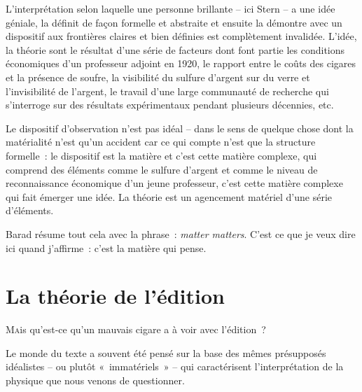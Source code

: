 L'interprétation selon laquelle une personne brillante -- ici Stern -- a
une idée géniale, la définit de façon formelle et abstraite et ensuite
la démontre avec un dispositif aux frontières claires et bien définies
est complètement invalidée. L'idée, la théorie sont le résultat d'une
série de facteurs dont font partie les conditions économiques d'un
professeur adjoint en 1920, le rapport entre le coûts des cigares et la
présence de soufre, la visibilité du sulfure d'argent sur du verre et
l'invisibilité de l'argent, le travail d'une large communauté de
recherche qui s'interroge sur des résultats expérimentaux pendant
plusieurs décennies, etc.

Le dispositif d'observation n'est pas idéal -- dans le sens de quelque
chose dont la matérialité n'est qu'un accident car ce qui compte n'est
que la structure formelle~: le dispositif est la matière et c'est cette
matière complexe, qui comprend des éléments comme le sulfure d'argent et
comme le niveau de reconnaissance économique d'un jeune professeur,
c'est cette matière complexe qui fait émerger une idée. La théorie est
un agencement matériel d'une série d'éléments.

Barad résume tout cela avec la phrase~: \emph{matter matters}. C'est ce
que je veux dire ici quand j'affirme~: c'est la matière qui pense.

\hypertarget{la-thuxe9orie-de-luxe9dition}{%
\chapter{La théorie de l'édition}\label{la-thuxe9orie-de-luxe9dition}}

\lettrine{M}ais qu'est-ce qu'un mauvais cigare a à voir avec l'édition~?

Le monde du texte a souvent été pensé sur la base des mêmes présupposés
idéalistes -- ou plutôt «~immatériels~» -- qui caractérisent
l'interprétation de la physique que nous venons de questionner.


